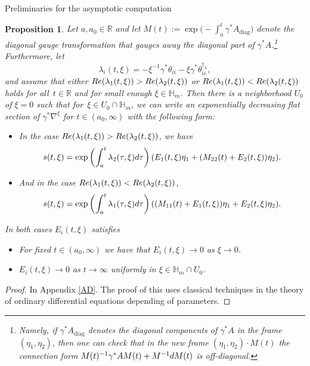 \documentclass[11pt]{article}
\numberwithin{equation}{section}
\newtheorem{Proposition}[Theorem]{Proposition}
 { \theoremstyle{definition}
\newtheorem{Definition}[Theorem]{Definition}
\newtheorem{Notation}[Theorem]{Notation}
\newtheorem{Example}[Theorem]{Example}
\newtheorem{Remark}[Theorem]{Remark} }
\numberwithin{equation}{section}
\begin{document}
\begin{subsubsection}{Preliminaries for the asymptotic computation}
\begin{Proposition} \label{prelimasymp} Let $a,a_0\in \mathbb{R}$ and let $M(t):=\exp \bigl(-\int_{a}^{t}\gamma^*A_{\operatorname{diag}}\bigr)$ denote the diagonal gauge transformation that gauges away the diagonal part of $\gamma^*A$.\footnote{Namely, if $\gamma^*A_{\operatorname{diag}}$ denotes the diagonal components of $\gamma^*A$ in the frame $(\eta_1,\eta_2)$, then one can check that in the new frame $(\eta_1,\eta_2)\cdot M(t)$ the connection form $M(t)^{-1}\gamma^*AM(t)+M^{-1}{\rm d}M(t)$ is off-diagonal.} Furthermore, let
\begin{equation*}
 \lambda_i(t,\xi)= -\xi^{-1}\gamma^*\theta_{ii} - \xi \gamma^* \theta^{\dagger_h}_{ii},
\end{equation*}
and assume that either $\textnormal{Re}(\lambda_1(t,\xi))>\textnormal{Re}(\lambda_2(t,\xi))$ or $\textnormal{Re}(\lambda_1(t,\xi))<\textnormal{Re}(\lambda_2(t,\xi))$ holds for all~${t\in \mathbb{R}}$ and for small enough $\xi \in \mathbb{H}_m$. Then there is a neighborhood $U_0$ of $\xi=0$ such that for~${\xi \in U_0\cap \mathbb{H}_m}$, we can write an exponentially decreasing flat section of $\gamma^*\nabla^{\xi}$ for $t\in (a_0,\infty)$ with the following form:
\begin{itemize}\itemsep=0pt
 \item In the case $\textnormal{Re}(\lambda_1(t,\xi))>\textnormal{Re}(\lambda_2(t,\xi))$, we have
 \begin{equation*}
 s(t,\xi)=\exp \left(\int_a^{t}\lambda_2(\tau,\xi){\rm d}\tau\right)(E_1(t,\xi)\eta_1 + (M_{22}(t)+E_2(t,\xi))\eta_2).
 \end{equation*}
 \item And in the case $\textnormal{Re}(\lambda_1(t,\xi))<\textnormal{Re}(\lambda_2(t,\xi))$,
 \begin{equation*}
 s(t,\xi)=\exp \left(\int_a^{t}\lambda_1(\tau,\xi){\rm d}\tau\right)((M_{11}(t)+E_1(t,\xi))\eta_1 + E_2(t,\xi)\eta_2).
 \end{equation*}
\end{itemize}
In both cases $E_i(t,\xi)$ satisfies
\begin{itemize}\itemsep=0pt
 \item For fixed $t \in (a_0,\infty)$ we have that $E_i(t,\xi) \to 0$ as $\xi \to 0$.
 \item $E_i(t,\xi)\to 0$ as $t \to \infty$ uniformly in $\xi \in \mathbb{H}_m\cap U_{0}$.
\end{itemize}
\end{Proposition}
\begin{proof}
In Appendix \ref{AD}. The proof of this uses classical techniques in the theory of ordinary differential equations depending of parameters.
\end{proof}


\end{subsubsection}
\end{document}
